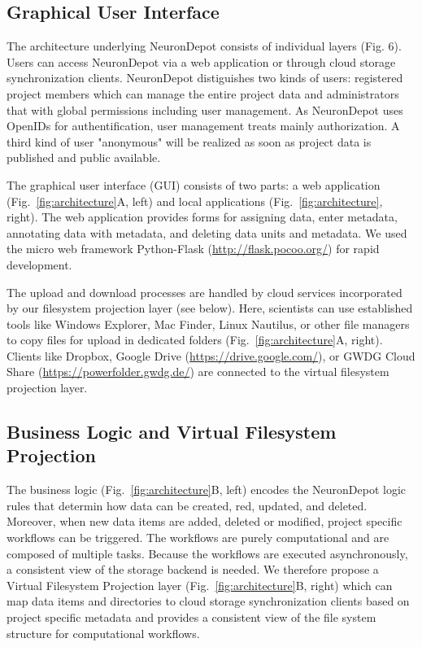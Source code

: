 \documentclass{frontiersSCNS} %
\begin{document}
\subsection{Graphical User Interface}
The architecture underlying NeuronDepot consists of individual layers (Fig. 6).
Users can access NeuronDepot via a web application or through cloud storage
synchronization clients. NeuronDepot distiguishes two kinds of users:
registered project members which can manage the entire project data and
administrators that with global permissions including user management. As
NeuronDepot uses OpenIDs for authentification, user management treats mainly
authorization. A third kind of user "anonymous" will be realized as soon as
project data is published and public available.

The graphical user interface (GUI) consists of two parts: a web application
(Fig.~\ref{fig:architecture}A, left) and local applications
(Fig.~\ref{fig:architecture}, right). The web application provides forms for
assigning data, enter metadata, annotating data with metadata, and deleting
data units and metadata. We used the micro web framework Python-Flask
(\url{http://flask.pocoo.org/}) for rapid development.

The upload and download processes are handled by cloud services incorporated by
our filesystem projection layer (see below). Here, scientists can use
established tools like Windows Explorer, Mac Finder, Linux Nautilus, or other
file managers to copy files for upload in dedicated folders
(Fig.~\ref{fig:architecture}A, right).  Clients like Dropbox, Google Drive
(\url{https://drive.google.com/}), or GWDG Cloud Share
(\url{https://powerfolder.gwdg.de/}) are connected to the virtual filesystem
projection layer. 


\subsection{Business Logic and Virtual Filesystem Projection}\label{sec:projection_layer}

The business logic (Fig.~\ref{fig:architecture}B, left) encodes the NeuronDepot
logic rules that determin how data can be created, red, updated, and deleted.
Moreover, when new data items are added, deleted or modified, project specific
workflows can be triggered. The workflows are purely computational and are
composed of multiple tasks. Because the workflows are executed asynchronously,
a consistent view of the storage backend is needed. We therefore propose a
Virtual Filesystem Projection layer (Fig.~\ref{fig:architecture}B, right) which
can map data items and directories to cloud storage synchronization clients
based on project specific metadata and provides a consistent view of the file
system structure for computational workflows.
\end{document}
